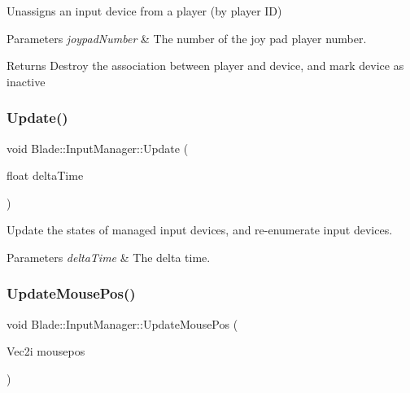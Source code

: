Unassigns an input device from a player (by player ID) 


\begin{DoxyParams}{Parameters}
{\em joypad\+Number} & The number of the joy pad player number. \\
\hline
\end{DoxyParams}
\begin{DoxyReturn}{Returns}
Destroy the association between player and device, and mark device as inactive 
\end{DoxyReturn}
\mbox{\label{class_blade_1_1_input_manager_a1184a42c2c6b0f96d4169936090f9480}} 
\subsubsection{\texorpdfstring{Update()}{Update()}}
{\footnotesize\ttfamily void Blade\+::\+Input\+Manager\+::\+Update (\begin{DoxyParamCaption}\item[{float}]{delta\+Time }\end{DoxyParamCaption})}



Update the states of managed input devices, and re-\/enumerate input devices. 


\begin{DoxyParams}{Parameters}
{\em delta\+Time} & The delta time. \\
\hline
\end{DoxyParams}
\mbox{\label{class_blade_1_1_input_manager_a61209430d6682ade700cc9fa89c7f50e}} 
\subsubsection{\texorpdfstring{Update\+Mouse\+Pos()}{UpdateMousePos()}}
{\footnotesize\ttfamily void Blade\+::\+Input\+Manager\+::\+Update\+Mouse\+Pos (\begin{DoxyParamCaption}\item[{Vec2i}]{mousepos }\end{DoxyParamCaption})}



